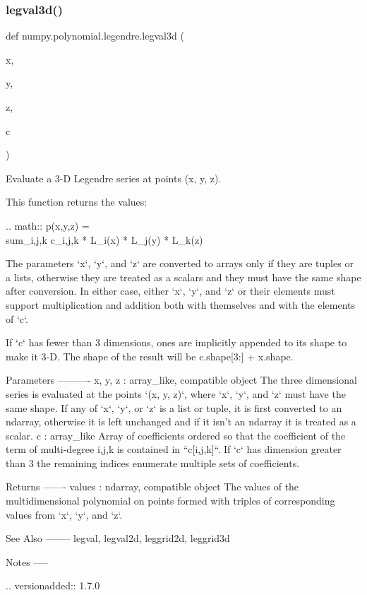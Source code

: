 \subsubsection{\texorpdfstring{legval3d()}{legval3d()}}
{\footnotesize\ttfamily def numpy.\+polynomial.\+legendre.\+legval3d (\begin{DoxyParamCaption}\item[{}]{x,  }\item[{}]{y,  }\item[{}]{z,  }\item[{}]{c }\end{DoxyParamCaption})}

\begin{DoxyVerb}Evaluate a 3-D Legendre series at points (x, y, z).

This function returns the values:

.. math:: p(x,y,z) = \\sum_{i,j,k} c_{i,j,k} * L_i(x) * L_j(y) * L_k(z)

The parameters `x`, `y`, and `z` are converted to arrays only if
they are tuples or a lists, otherwise they are treated as a scalars and
they must have the same shape after conversion. In either case, either
`x`, `y`, and `z` or their elements must support multiplication and
addition both with themselves and with the elements of `c`.

If `c` has fewer than 3 dimensions, ones are implicitly appended to its
shape to make it 3-D. The shape of the result will be c.shape[3:] +
x.shape.

Parameters
----------
x, y, z : array_like, compatible object
    The three dimensional series is evaluated at the points
    `(x, y, z)`, where `x`, `y`, and `z` must have the same shape.  If
    any of `x`, `y`, or `z` is a list or tuple, it is first converted
    to an ndarray, otherwise it is left unchanged and if it isn't an
    ndarray it is  treated as a scalar.
c : array_like
    Array of coefficients ordered so that the coefficient of the term of
    multi-degree i,j,k is contained in ``c[i,j,k]``. If `c` has dimension
    greater than 3 the remaining indices enumerate multiple sets of
    coefficients.

Returns
-------
values : ndarray, compatible object
    The values of the multidimensional polynomial on points formed with
    triples of corresponding values from `x`, `y`, and `z`.

See Also
--------
legval, legval2d, leggrid2d, leggrid3d

Notes
-----

.. versionadded:: 1.7.0\end{DoxyVerb}
 \mbox{\label{namespacenumpy_1_1polynomial_1_1legendre_ae910bfdd25cbfe134117aab5c71b7f64}} 
